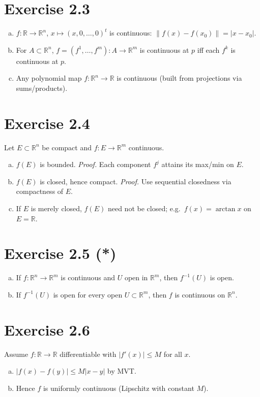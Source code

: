 \documentclass[11pt,a4paper]{article}
\begin{document}
\section*{Exercise 2.3}
\begin{enumerate}[a)]
\item $f:\mathbb{R}\to\mathbb{R}^n$, $x\mapsto (x,0,\dots,0)^t$ is continuous: $\|f(x)-f(x_0)\|=|x-x_0|$.
\item For $A\subset\mathbb{R}^n$, $f=(f^1,\dots,f^m):A\to\mathbb{R}^m$ is continuous at $p$ iff each $f^k$ is continuous at $p$.
\item Any polynomial map $f:\mathbb{R}^n\to\mathbb{R}$ is continuous (built from projections via sums/products).
\end{enumerate}

\section*{Exercise 2.4}
Let $E\subset\mathbb{R}^n$ be compact and $f:E\to\mathbb{R}^m$ continuous.
\begin{enumerate}[a)]
\item $f(E)$ is bounded. \textit{Proof.} Each component $f^j$ attains its max/min on $E$.
\item $f(E)$ is closed, hence compact. \textit{Proof.} Use sequential closedness via compactness of $E$.
\item If $E$ is merely closed, $f(E)$ need not be closed; e.g.\ $f(x)=\arctan x$ on $E=\mathbb{R}$.
\end{enumerate}

\section*{Exercise 2.5 (*)}
\begin{enumerate}[a)]
\item If $f:\mathbb{R}^n\to\mathbb{R}^m$ is continuous and $U$ open in $\mathbb{R}^m$, then $f^{-1}(U)$ is open.
\item If $f^{-1}(U)$ is open for every open $U\subset\mathbb{R}^m$, then $f$ is continuous on $\mathbb{R}^n$.
\end{enumerate}

\section*{Exercise 2.6}
Assume $f:\mathbb{R}\to\mathbb{R}$ differentiable with $|f'(x)|\le M$ for all $x$.
\begin{enumerate}[a)]
\item $|f(x)-f(y)|\le M|x-y|$ by MVT.
\item Hence $f$ is uniformly continuous (Lipschitz with constant $M$).
\end{enumerate}
\end{document}
